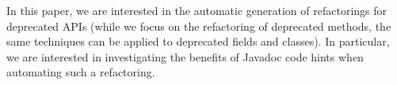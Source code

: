 \documentclass[conference]{IEEEtran}
\begin{document}
In this paper, we are interested in the automatic generation of refactorings for deprecated APIs (while we focus on the refactoring of deprecated methods, the same
techniques can be applied to deprecated fields and classes). 
In particular, we are interested in investigating the benefits of Javadoc code hints when automating such a refactoring.



\end{document}
